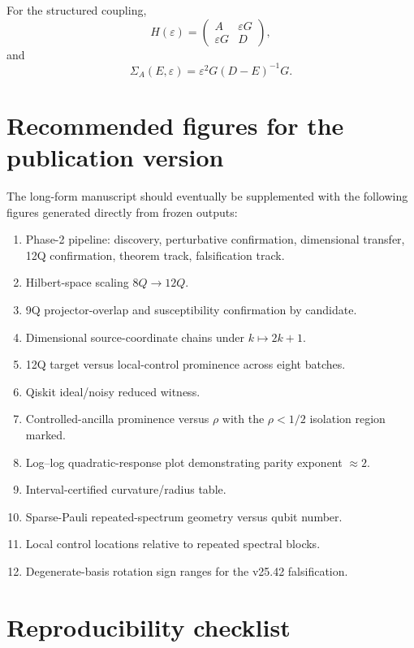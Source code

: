 \documentclass[11pt,a4paper]{article}
\newcommand{\eps}{\varepsilon}
\begin{document}
For the structured coupling,
\[
H(\eps)=
\begin{pmatrix}
A&\eps G\\
\eps G&D
\end{pmatrix},
\]
and
\[
\Sigma_A(E,\eps)
=
\eps^2G(D-E)^{-1}G.
\]

\section{Recommended figures for the publication version}

The long-form manuscript should eventually be supplemented with the following
figures generated directly from frozen outputs:

\begin{enumerate}[label=\arabic*.]
\item Phase-2 pipeline: discovery, perturbative confirmation, dimensional
      transfer, 12Q confirmation, theorem track, falsification track.
\item Hilbert-space scaling \(8Q\to12Q\).
\item 9Q projector-overlap and susceptibility confirmation by candidate.
\item Dimensional source-coordinate chains under \(k\mapsto2k+1\).
\item 12Q target versus local-control prominence across eight batches.
\item Qiskit ideal/noisy reduced witness.
\item Controlled-ancilla prominence versus \(\rho\) with the
      \(\rho<1/2\) isolation region marked.
\item Log--log quadratic-response plot demonstrating parity exponent
      \(\approx2\).
\item Interval-certified curvature/radius table.
\item Sparse-Pauli repeated-spectrum geometry versus qubit number.
\item Local control locations relative to repeated spectral blocks.
\item Degenerate-basis rotation sign ranges for the v25.42 falsification.
\end{enumerate}

\section{Reproducibility checklist}
\end{document}
